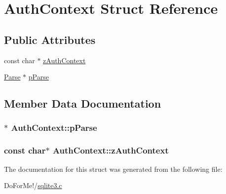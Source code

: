 \hypertarget{struct_auth_context}{\section{Auth\-Context Struct Reference}
\label{struct_auth_context}
}
\subsection*{Public Attributes}
\begin{DoxyCompactItemize}
\item 
const char $\ast$ \hyperlink{struct_auth_context_a1b095b152b72326476ac3f7edcaee78a}{z\-Auth\-Context}
\item 
\hyperlink{struct_parse}{Parse} $\ast$ \hyperlink{struct_auth_context_a8df2931d8f4facf59073c92315b00bfa}{p\-Parse}
\end{DoxyCompactItemize}


\subsection{Member Data Documentation}
\hypertarget{struct_auth_context_a8df2931d8f4facf59073c92315b00bfa}{
\subsubsection[{p\-Parse}]{$\ast$ Auth\-Context\-::p\-Parse}}\label{struct_auth_context_a8df2931d8f4facf59073c92315b00bfa}
\hypertarget{struct_auth_context_a1b095b152b72326476ac3f7edcaee78a}{
\subsubsection[{z\-Auth\-Context}]{\setlength{\rightskip}{0pt plus 5cm}const char$\ast$ Auth\-Context\-::z\-Auth\-Context}}\label{struct_auth_context_a1b095b152b72326476ac3f7edcaee78a}


The documentation for this struct was generated from the following file\-:\begin{DoxyCompactItemize}
\item 
Do\-For\-Me!/\hyperlink{sqlite3_8c}{sqlite3.\-c}\end{DoxyCompactItemize}
